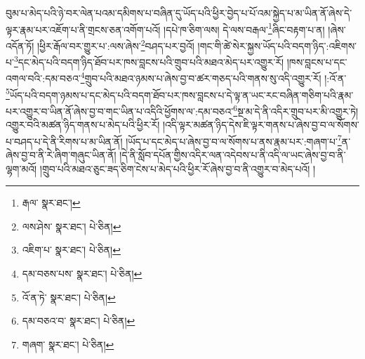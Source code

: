 བུམ་པ་མེད་པའི་ཉེ་བར་ལེན་པའམ་དམིགས་པ་བཞིན་དུ་ཡོད་པའི་ཕྱིར་བྱེད་པ་པོ་འམ་སྐྱེད་པ་མ་ཡིན་ནོ་ཞེས་དེ་ལྟར་རྣམ་པར་འཇོག་པ་ནི་གྲངས་ཅན་འགོག་པའོ། །དཔེ་ཁ་ཅིག་ལས། དེ་ལས་བརྒལ་\footnote{རྒལ་  སྣར་ཐང་། }ཞིང་བརྟག་པ་ན། །ཞེས་འདོན་ཏོ། །ཕྱིར་རྒོལ་བར་གྱུར་པ་:ལས་ཞེས་\footnote{ལས་ཤེས་  སྣར་ཐང་།  པེ་ཅིན། }བཤད་པར་བྱའོ། །གང་གི་ཚེ་སེར་སྐྱས་ཡོད་པའི་བདག་ཉིད་:འཇིགས་པ་\footnote{འཇིག་པ་  སྣར་ཐང་།  པེ་ཅིན། }དང་མེད་པའི་བདག་ཉིད་ཐོབ་པར་ཁས་བླངས་པའི་གྲུབ་པའི་མཐའ་མེད་པར་འགྱུར་རོ། །ཁས་བླངས་པ་དང་འགལ་བའི་:དམ་བཅའ་\footnote{དམ་བཅས་པས་  སྣར་ཐང་།  པེ་ཅིན། }གྲུབ་པའི་མཐའ་ཉམས་པ་ཞེས་བྱ་བ་ཚར་གཅད་པའི་གནས་སུ་འདི་འགྱུར་རོ། །:འོ་ན་\footnote{འོ་ན་ཏེ་  སྣར་ཐང་།  པེ་ཅིན། }ཡོད་པའི་བདག་ཉམས་པ་དང་མེད་པའི་བདག་ཐོབ་པར་ཁས་བླངས་པ་དེ་ལྟ་ན་ཡང་རང་བཞིན་གཅིག་པའི་རྣམ་པར་འགྱུར་བ་ཡིན་ནོ་ཞེས་བྱ་བ་གང་ཡིན་པ་འདིའི་ཕྱོགས་ལ་:དམ་བཅའ་\footnote{དམ་བཅའ་བ་  སྣར་ཐང་།  པེ་ཅིན། }སྔ་མ་དེ་ནི་འདིར་གྲུབ་པར་མི་འགྱུར་ཏེ། འགྱུར་བའི་མཚན་ཉིད་གནས་པ་མེད་པའི་ཕྱིར་རོ། །འདི་ལྟར་མཚན་ཉིད་དེས་ཇི་ལྟར་གནས་པ་ཞེས་བྱ་བ་ལ་སོགས་པ་བཤད་པ་དེ་ནི་རིགས་པ་མ་ཡིན་ནོ། །ཡོད་པ་དང་མེད་པ་ཞེས་བྱ་བ་ལ་སོགས་པ་ནས་རྣམ་པར་:གཞག་པ་\footnote{གཞག་  སྣར་ཐང་།  པེ་ཅིན། }ན་ཞེས་བྱ་བ་ནི་རེ་ཞིག་གཞུང་ཡིན་ནོ། །དེ་ནི་སློབ་དཔོན་གྱིས་འདིར་ལན་འདེབས་པ་ནི་འདི་ལ་ཡང་ཞེས་བྱ་བ་ནི་ལྷག་མའོ། །གྲུབ་པའི་མཐའ་ཅུང་ཟད་ཅིག་ངེས་པ་མེད་པའི་ཕྱིར་རོ་ཞེས་བྱ་བ་ནི་འགྱུར་བ་མེད་པའོ། །
